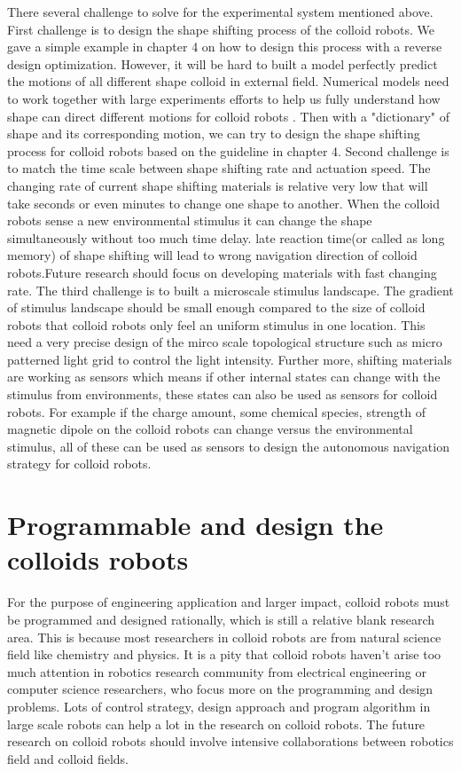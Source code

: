 There several challenge to solve for the experimental system mentioned above. First challenge  is to design the shape shifting process of the colloid robots. We gave a simple example in chapter 4 on how to design this process with a reverse design optimization. However, it will be hard to built a model perfectly predict the motions of all different shape colloid in external field. Numerical models need to work together with large experiments efforts to help us fully understand how shape can direct different motions for colloid robots . \cite{lee2019directed} Then with a "dictionary" of shape and its corresponding motion, we can try to design the shape shifting process for colloid robots based on the guideline in chapter 4. Second challenge is to match the time scale between shape shifting rate and actuation speed. The changing rate of current shape shifting materials is relative very low that will take seconds or even minutes to change one shape to another. When the colloid robots sense a new environmental stimulus it can change the shape simultaneously without too  much time delay. late reaction time(or called as long memory) of shape shifting will  lead to wrong navigation direction of colloid robots.Future research should focus on developing materials with fast changing rate. The third challenge is to built a microscale stimulus landscape. The gradient of stimulus landscape should be small enough compared to the size of colloid robots that colloid robots only feel an uniform stimulus in one location. This need a very precise  design of the mirco scale topological structure such as micro patterned light grid to control the light intensity. Further more, shifting materials are working as sensors which means if other internal states can change with the stimulus from  environments, these states can also be used as sensors for colloid robots. For example if the charge amount, some chemical species, strength of magnetic dipole on the colloid robots can change versus the environmental stimulus, all of these can be used as sensors to design the autonomous navigation strategy for colloid robots.  




\section{Programmable and design the colloids robots}
For the purpose of engineering application and larger impact, colloid robots must be programmed and designed rationally, which is still a relative blank research area. This is because most researchers in colloid robots are from natural science field like chemistry and physics. It is a pity that colloid robots haven't arise too much attention in robotics research community from electrical engineering or computer science researchers, who focus more on the programming and design problems.\cite{das2019cellular}  Lots of control strategy, design approach and program algorithm in large scale robots can help a lot in the research on colloid robots.  The future research on colloid robots should involve intensive collaborations between robotics field and colloid fields.

